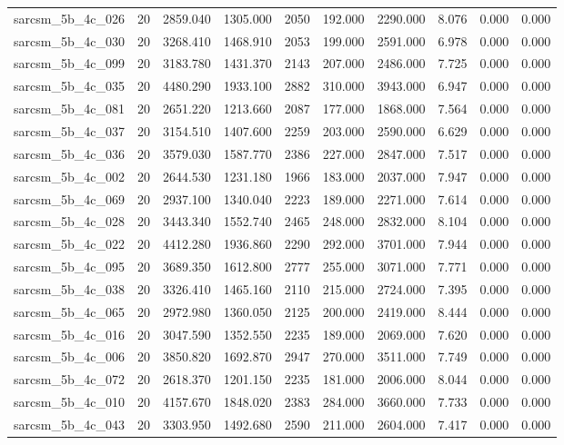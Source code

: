 \begin{tabular}{lrrrrrrrrr}
sarcsm\_5b\_4c\_026 & 20 & 2859.040 & 1305.000 & 2050 & 192.000 & 2290.000 & 8.076 & 0.000 & 0.000 \\
sarcsm\_5b\_4c\_030 & 20 & 3268.410 & 1468.910 & 2053 & 199.000 & 2591.000 & 6.978 & 0.000 & 0.000 \\
sarcsm\_5b\_4c\_099 & 20 & 3183.780 & 1431.370 & 2143 & 207.000 & 2486.000 & 7.725 & 0.000 & 0.000 \\
sarcsm\_5b\_4c\_035 & 20 & 4480.290 & 1933.100 & 2882 & 310.000 & 3943.000 & 6.947 & 0.000 & 0.000 \\
sarcsm\_5b\_4c\_081 & 20 & 2651.220 & 1213.660 & 2087 & 177.000 & 1868.000 & 7.564 & 0.000 & 0.000 \\
sarcsm\_5b\_4c\_037 & 20 & 3154.510 & 1407.600 & 2259 & 203.000 & 2590.000 & 6.629 & 0.000 & 0.000 \\
sarcsm\_5b\_4c\_036 & 20 & 3579.030 & 1587.770 & 2386 & 227.000 & 2847.000 & 7.517 & 0.000 & 0.000 \\
sarcsm\_5b\_4c\_002 & 20 & 2644.530 & 1231.180 & 1966 & 183.000 & 2037.000 & 7.947 & 0.000 & 0.000 \\
sarcsm\_5b\_4c\_069 & 20 & 2937.100 & 1340.040 & 2223 & 189.000 & 2271.000 & 7.614 & 0.000 & 0.000 \\
sarcsm\_5b\_4c\_028 & 20 & 3443.340 & 1552.740 & 2465 & 248.000 & 2832.000 & 8.104 & 0.000 & 0.000 \\
sarcsm\_5b\_4c\_022 & 20 & 4412.280 & 1936.860 & 2290 & 292.000 & 3701.000 & 7.944 & 0.000 & 0.000 \\
sarcsm\_5b\_4c\_095 & 20 & 3689.350 & 1612.800 & 2777 & 255.000 & 3071.000 & 7.771 & 0.000 & 0.000 \\
sarcsm\_5b\_4c\_038 & 20 & 3326.410 & 1465.160 & 2110 & 215.000 & 2724.000 & 7.395 & 0.000 & 0.000 \\
sarcsm\_5b\_4c\_065 & 20 & 2972.980 & 1360.050 & 2125 & 200.000 & 2419.000 & 8.444 & 0.000 & 0.000 \\
sarcsm\_5b\_4c\_016 & 20 & 3047.590 & 1352.550 & 2235 & 189.000 & 2069.000 & 7.620 & 0.000 & 0.000 \\
sarcsm\_5b\_4c\_006 & 20 & 3850.820 & 1692.870 & 2947 & 270.000 & 3511.000 & 7.749 & 0.000 & 0.000 \\
sarcsm\_5b\_4c\_072 & 20 & 2618.370 & 1201.150 & 2235 & 181.000 & 2006.000 & 8.044 & 0.000 & 0.000 \\
sarcsm\_5b\_4c\_010 & 20 & 4157.670 & 1848.020 & 2383 & 284.000 & 3660.000 & 7.733 & 0.000 & 0.000 \\
sarcsm\_5b\_4c\_043 & 20 & 3303.950 & 1492.680 & 2590 & 211.000 & 2604.000 & 7.417 & 0.000 & 0.000 \\

\end{tabular}
